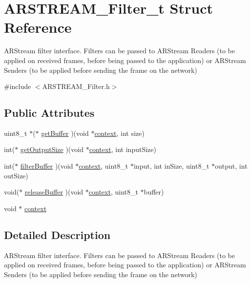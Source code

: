 \hypertarget{struct_a_r_s_t_r_e_a_m___filter__t}{}\section{A\+R\+S\+T\+R\+E\+A\+M\+\_\+\+Filter\+\_\+t Struct Reference}
\label{struct_a_r_s_t_r_e_a_m___filter__t}


A\+R\+Stream filter interface. Filters can be passed to A\+R\+Stream Readers (to be applied on received frames, before being passed to the application) or A\+R\+Stream Senders (to be applied before sending the frame on the network)  




{\ttfamily \#include $<$A\+R\+S\+T\+R\+E\+A\+M\+\_\+\+Filter.\+h$>$}

\subsection*{Public Attributes}
\begin{DoxyCompactItemize}
\item 
uint8\+\_\+t $\ast$($\ast$ \hyperlink{struct_a_r_s_t_r_e_a_m___filter__t_aa291d468bba578e3074c5ea474146333}{get\+Buffer} )(void $\ast$\hyperlink{struct_a_r_s_t_r_e_a_m___filter__t_a8c0052e7db6a36a634489e20ed266c75}{context}, int size)
\item 
int($\ast$ \hyperlink{struct_a_r_s_t_r_e_a_m___filter__t_a24e4b1dac2aeb18d6b316700982d4c2d}{get\+Output\+Size} )(void $\ast$\hyperlink{struct_a_r_s_t_r_e_a_m___filter__t_a8c0052e7db6a36a634489e20ed266c75}{context}, int input\+Size)
\item 
int($\ast$ \hyperlink{struct_a_r_s_t_r_e_a_m___filter__t_afffa4052478ed0e26779d7a09dc8ea40}{filter\+Buffer} )(void $\ast$\hyperlink{struct_a_r_s_t_r_e_a_m___filter__t_a8c0052e7db6a36a634489e20ed266c75}{context}, uint8\+\_\+t $\ast$input, int in\+Size, uint8\+\_\+t $\ast$output, int out\+Size)
\item 
void($\ast$ \hyperlink{struct_a_r_s_t_r_e_a_m___filter__t_affb86c1dbfd31a66ef601c1b4e0fcbe4}{release\+Buffer} )(void $\ast$\hyperlink{struct_a_r_s_t_r_e_a_m___filter__t_a8c0052e7db6a36a634489e20ed266c75}{context}, uint8\+\_\+t $\ast$buffer)
\item 
void $\ast$ \hyperlink{struct_a_r_s_t_r_e_a_m___filter__t_a8c0052e7db6a36a634489e20ed266c75}{context}
\end{DoxyCompactItemize}


\subsection{Detailed Description}
A\+R\+Stream filter interface. Filters can be passed to A\+R\+Stream Readers (to be applied on received frames, before being passed to the application) or A\+R\+Stream Senders (to be applied before sending the frame on the network) 

